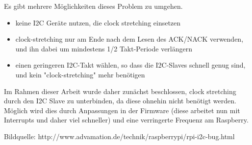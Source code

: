 Es gibt mehrere Möglichkeiten dieses Problem zu umgehen.
\begin{itemize}
	\item keine I2C Geräte nutzen, die clock stretching einsetzen
	\item clock-stretching nur am Ende nach dem Lesen des ACK/NACK verwenden, und ihn dabei um mindestens 1/2 Takt-Periode verlängern
	\item einen geringeren I2C-Takt wählen, so dass die I2C-Slaves schnell genug sind, und kein "clock-stretching" mehr benötigen
\end{itemize}
Im Rahmen dieser Arbeit wurde daher zunächst beschlossen, clock stretching durch den I2C Slave zu unterbinden, da diese ohnehin nicht benötigt werden. Möglich wird dies durch Anpassungen in der Firmware (diese arbeitet nun mit Interrupts und daher viel schneller) und eine verringerte Frequenz am Raspberry.



Bildquelle: http://www.advamation.de/technik/raspberrypi/rpi-i2c-bug.html

